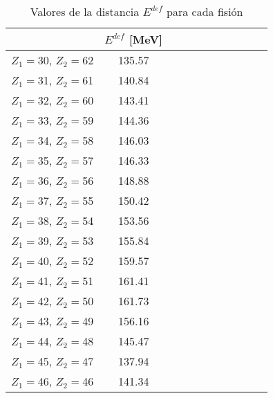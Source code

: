 \begin{table}[h!]
\caption{Valores de la distancia $E^{def}$ para cada fisión}
\label{tab:def}
\begin{tabular}{ccccccccccc}
\toprule
 & $E^{def}$ [MeV] \\
\midrule
$Z_1=$30, $Z_2=$62 & 135.57 \\
$Z_1=$31, $Z_2=$61 & 140.84 \\
$Z_1=$32, $Z_2=$60 & 143.41 \\
$Z_1=$33, $Z_2=$59 & 144.36 \\
$Z_1=$34, $Z_2=$58 & 146.03 \\
$Z_1=$35, $Z_2=$57 & 146.33 \\
$Z_1=$36, $Z_2=$56 & 148.88 \\
$Z_1=$37, $Z_2=$55 & 150.42 \\
$Z_1=$38, $Z_2=$54 & 153.56 \\
$Z_1=$39, $Z_2=$53 & 155.84 \\
$Z_1=$40, $Z_2=$52 & 159.57 \\
$Z_1=$41, $Z_2=$51 & 161.41 \\
$Z_1=$42, $Z_2=$50 & 161.73 \\
$Z_1=$43, $Z_2=$49 & 156.16 \\
$Z_1=$44, $Z_2=$48 & 145.47 \\
$Z_1=$45, $Z_2=$47 & 137.94 \\
$Z_1=$46, $Z_2=$46 & 141.34 \\
\bottomrule
\end{tabular}
\end{table}
